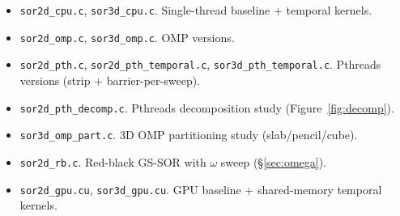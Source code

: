 \documentclass[11pt]{article}
\begin{document}
\begin{itemize}[leftmargin=1.4em,itemsep=1pt,topsep=1pt]
  \item \texttt{sor2d\_cpu.c}, \texttt{sor3d\_cpu.c}. Single-thread
        baseline + temporal kernels.
  \item \texttt{sor2d\_omp.c}, \texttt{sor3d\_omp.c}. OMP versions.
  \item \texttt{sor2d\_pth.c}, \texttt{sor2d\_pth\_temporal.c},
        \texttt{sor3d\_pth\_temporal.c}. Pthreads versions
        (strip + barrier-per-sweep).
  \item \texttt{sor2d\_pth\_decomp.c}. Pthreads decomposition study
        (Figure~\ref{fig:decomp}).
  \item \texttt{sor3d\_omp\_part.c}. 3D OMP partitioning study
        (slab/pencil/cube).
  \item \texttt{sor2d\_rb.c}. Red-black GS-SOR with $\omega$ sweep
        (§\ref{sec:omega}).
  \item \texttt{sor2d\_gpu.cu}, \texttt{sor3d\_gpu.cu}. GPU baseline
        + shared-memory temporal kernels.
\end{itemize}
\end{document}
